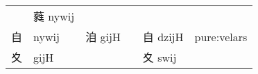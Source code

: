 \documentclass[14pt,a4paper]{scrartcl}
\begin{document}
\begin{longtable}[c]{@{}llllll@{}}
\begin{minipage}[t]{0.14\columnwidth}
\strut\end{minipage} &
\begin{minipage}[t]{0.14\columnwidth}\raggedright\strut
蕤 nywij
\strut\end{minipage} &
\begin{minipage}[t]{0.14\columnwidth}\raggedright\strut
\strut\end{minipage}\tabularnewline
\begin{minipage}[t]{0.14\columnwidth}\raggedright\strut
自
\strut\end{minipage} &
\begin{minipage}[t]{0.14\columnwidth}\raggedright\strut
nywij
\strut\end{minipage} &
\begin{minipage}[t]{0.14\columnwidth}\raggedright\strut
洎 gijH
\strut\end{minipage} &
\begin{minipage}[t]{0.14\columnwidth}\raggedright\strut
\strut\end{minipage} &
\begin{minipage}[t]{0.14\columnwidth}\raggedright\strut
自 dzijH
\strut\end{minipage} &
\begin{minipage}[t]{0.14\columnwidth}\raggedright\strut
pure:velars
\strut\end{minipage}\tabularnewline
\begin{minipage}[t]{0.14\columnwidth}\raggedright\strut
夊
\strut\end{minipage} &
\begin{minipage}[t]{0.14\columnwidth}\raggedright\strut
gijH
\strut\end{minipage} &
\begin{minipage}[t]{0.14\columnwidth}\raggedright\strut
\strut\end{minipage} &
\begin{minipage}[t]{0.14\columnwidth}\raggedright\strut
\strut\end{minipage} &
\begin{minipage}[t]{0.14\columnwidth}\raggedright\strut
夊 swij
\strut\end{minipage} &
\begin{minipage}[t]{0.14\columnwidth}\raggedright\strut
\strut\end{minipage}\tabularnewline
\bottomrule
\end{longtable}
\end{document}
